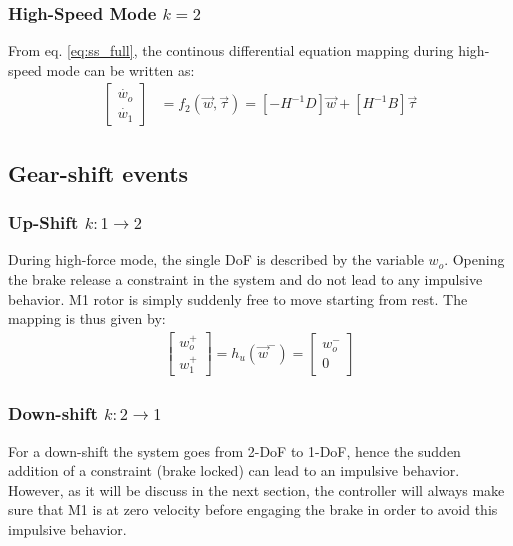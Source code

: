\subsubsection{High-Speed Mode $k=2$}

From eq. \eqref{eq:ss_full}, the continous differential equation mapping during high-speed mode can be written as:
%
\begin{align}
\left[
\begin{array}{c}
\dot{w_o}\\
\dot{w_1}
\end{array}
\right] &= f_2( \vec{w} , \vec{\tau} ) = 
\left[ -H^{-1} D \right]
\vec{w} 
+ 
\left[ H^{-1} B \right] 
\vec{\tau}
\label{eq:f2}
\end{align}


\subsection{Gear-shift events}

\subsubsection{Up-Shift $k:1\rightarrow2$}

During high-force mode, the single DoF is described by the variable $w_o$. Opening the brake release a constraint in the system and do not lead to any impulsive behavior. M1 rotor is simply suddenly free to move starting from rest. The mapping is thus given by:
\begin{align} 
\left[
\begin{array}{c}
w_o^+ \\ w_1^+
\end{array}
\right] = h_u( \vec{w}^- ) = 
\left[
\begin{array}{c}
w_o^- \\ 0
\end{array}
\right]
\label{eq:upshiftmap}
\end{align}



\subsubsection{Down-shift $k:2\rightarrow1$}

For a down-shift the system goes from 2-DoF to 1-DoF, hence the sudden addition of a constraint (brake locked) can lead to an impulsive behavior. However, as it will be discuss in the next section, the controller will always make sure that M1 is at zero velocity before engaging the brake in order to avoid this impulsive behavior. 

